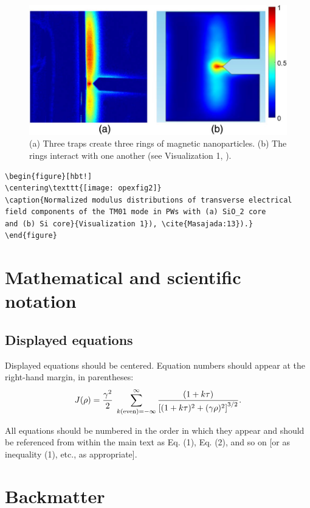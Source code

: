 \documentclass{osa-article}
\begin{document}
\begin{figure}[ht!]
\centering\includegraphics{osafig2}
\caption{(a) Three traps create three rings of magnetic nanoparticles. (b) The rings interact with one another (see \textcolor{urlblue}{Visualization 1}, \cite{Masajada:13}).}
\end{figure}


\begin{verbatim}
\begin{figure}[hbt!]
\centering\texttt{[image: opexfig2]}
\caption{Normalized modulus distributions of transverse electrical
field components of the TM01 mode in PWs with (a) SiO_2 core
and (b) Si core}{Visualization 1}), \cite{Masajada:13}).}
\end{figure}
\end{verbatim}

\section{Mathematical and scientific notation}

\subsection{Displayed equations} Displayed equations should be centered.
Equation numbers should appear at the right-hand margin, in
parentheses:
\begin{equation}
J(\rho) =
 \frac{\gamma^2}{2} \; \sum_{k({\rm even}) = -\infty}^{\infty}
	\frac{(1 + k \tau)}{ \left[ (1 + k \tau)^2 + (\gamma  \rho)^2  \right]^{3/2} }.
\end{equation}

All equations should be numbered in the order in which they appear
and should be referenced  from within the main text as Eq. (1),
Eq. (2), and so on [or as inequality (1), etc., as appropriate].

\section{Backmatter}
\end{document}

